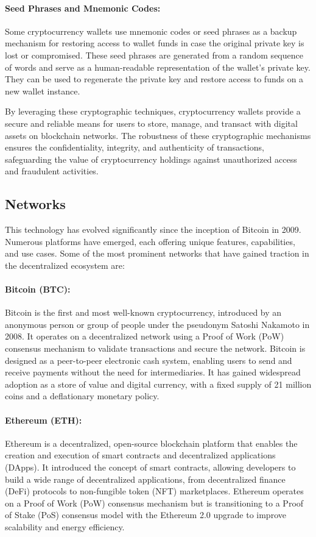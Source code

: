 \paragraph{Seed Phrases and Mnemonic Codes:}
Some cryptocurrency wallets use mnemonic codes or seed phrases as a backup
mechanism for restoring access to wallet funds in case the original private key
is lost or compromised. These seed phrases are generated from a random sequence
of words and serve as a human-readable representation of the wallet's private
key. They can be used to regenerate the private key and restore access to funds
on a new wallet instance.

By leveraging these cryptographic techniques, cryptocurrency wallets provide a
secure and reliable means for users to store, manage, and transact with digital
assets on blockchain networks. The robustness of these cryptographic mechanisms
ensures the confidentiality, integrity, and authenticity of transactions,
safeguarding the value of cryptocurrency holdings against unauthorized access
and fraudulent activities.

\subsection{Networks}
\label{subsec:networks}

This technology has evolved significantly since the inception of Bitcoin in
2009. Numerous platforms have emerged, each offering unique features,
capabilities, and use cases. Some of the most prominent networks that have
gained traction in the decentralized ecosystem are:

\paragraph{Bitcoin (BTC):}
Bitcoin is the first and most well-known cryptocurrency, introduced by an
anonymous person or group of people under the pseudonym Satoshi Nakamoto in
2008. It operates on a decentralized network using a Proof of Work (PoW)
consensus mechanism to validate transactions and secure the network. Bitcoin is
designed as a peer-to-peer electronic cash system, enabling users to send and
receive payments without the need for intermediaries. It has gained widespread
adoption as a store of value and digital currency, with a fixed supply of 21
million coins and a deflationary monetary policy.

\paragraph{Ethereum (ETH):}
Ethereum is a decentralized, open-source blockchain platform that enables the
creation and execution of smart contracts and decentralized applications
(DApps). It introduced the concept of smart contracts, allowing developers to
build a wide range of decentralized applications, from decentralized finance
(DeFi) protocols to non-fungible token (NFT) marketplaces. Ethereum operates on
a Proof of Work (PoW) consensus mechanism but is transitioning to a Proof of
Stake (PoS) consensus model with the Ethereum 2.0 upgrade to improve
scalability and energy efficiency.


